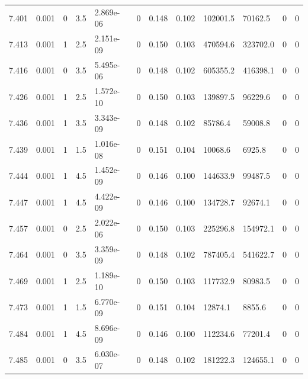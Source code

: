 \documentclass[preview]{standalone}
\begin{document}
{{{{{{{{{{{{{{{{{\begin{tabular}{L{1.2cm}C{1.2cm} C{0.3cm}C{0.5cm} C{1.4cm}C{1.4cm} C{1.4cm}C{1.4cm} C{1.6cm}C{1.6cm} C{1.6cm}C{1.6cm}}
  7.401  &  0.001  & 0     & 3.5 &  2.869e-06  & 0  &  0.148&   0.102& 102001.5 & 70162.5   &  0 & 0  \\ 
  7.413  &  0.001  & 1     & 2.5 &  2.151e-09  & 0  &  0.150&   0.103& 470594.6 & 323702.0   &  0 & 0  \\ 
  7.416  &  0.001  & 0     & 3.5 &  5.495e-06  & 0  &  0.148&   0.102& 605355.2 & 416398.1   &  0 & 0  \\ 
  7.426  &  0.001  & 1     & 2.5 &  1.572e-10  & 0  &  0.150&   0.103& 139897.5 & 96229.6   &  0 & 0  \\ 
  7.436  &  0.001  & 1     & 3.5 &  3.343e-09  & 0  &  0.148&   0.102& 85786.4 & 59008.8   &  0 & 0  \\ 
  7.439  &  0.001  & 1     & 1.5 &  1.016e-08  & 0  &  0.151&   0.104& 10068.6 & 6925.8   &  0 & 0  \\ 
  7.444  &  0.001  & 1     & 4.5 &  1.452e-09  & 0  &  0.146&   0.100& 144633.9 & 99487.5   &  0 & 0  \\ 
  7.447  &  0.001  & 1     & 4.5 &  4.422e-09  & 0  &  0.146&   0.100& 134728.7 & 92674.1   &  0 & 0  \\ 
  7.457  &  0.001  & 0     & 2.5 &  2.022e-06  & 0  &  0.150&   0.103& 225296.8 & 154972.1   &  0 & 0  \\ 
  7.464  &  0.001  & 0     & 3.5 &  3.359e-09  & 0  &  0.148&   0.102& 787405.4 & 541622.7   &  0 & 0  \\ 
  7.469  &  0.001  & 1     & 2.5 &  1.189e-10  & 0  &  0.150&   0.103& 117732.9 & 80983.5   &  0 & 0  \\ 
  7.473  &  0.001  & 1     & 1.5 &  6.770e-09  & 0  &  0.151&   0.104& 12874.1 & 8855.6   &  0 & 0  \\ 
  7.484  &  0.001  & 1     & 4.5 &  8.696e-09  & 0  &  0.146&   0.100& 112234.6 & 77201.4   &  0 & 0  \\ 
  7.485  &  0.001  & 0     & 3.5 &  6.030e-07  & 0  &  0.148&   0.102& 181222.3 & 124655.1   &  0 & 0  \\ 
\hline 
\end{tabular} 

}}}}}}}}}}}}}}}}}
\end{document}
